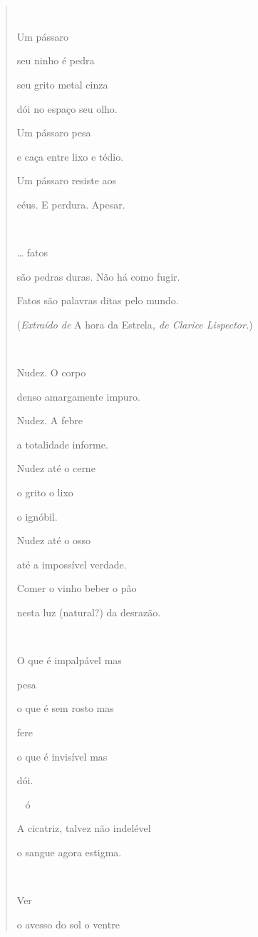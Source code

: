 \subsection{ }\label{section-11}

\begin{quote}
 

Um pássaro

seu ninho é pedra

seu grito metal cinza

dói no espaço seu olho.

Um pássaro pesa

e caça entre lixo e tédio.

Um pássaro resiste aos

céus. E perdura. Apesar.



\ldots{} fatos

são pedras duras. Não há como fugir.

Fatos são palavras ditas pelo mundo.

(\emph{Extraído de} A hora da Estrela\emph{, de Clarice Lispector.})



Nudez. O corpo

denso amargamente impuro.

Nudez. A febre

a totalidade informe.

Nudez até o cerne

o grito o lixo

o ignóbil.

Nudez até o osso

até a impossível verdade.

Comer o vinho beber o pão

nesta luz (natural?) da desrazão.



O que é impalpável mas

pesa

o que é sem rosto mas

fere

o que é invisível mas

dói.

ó

A cicatriz, talvez não indelével

o sangue agora estigma.



Ver

o avesso do sol o ventre


\end{quote}
